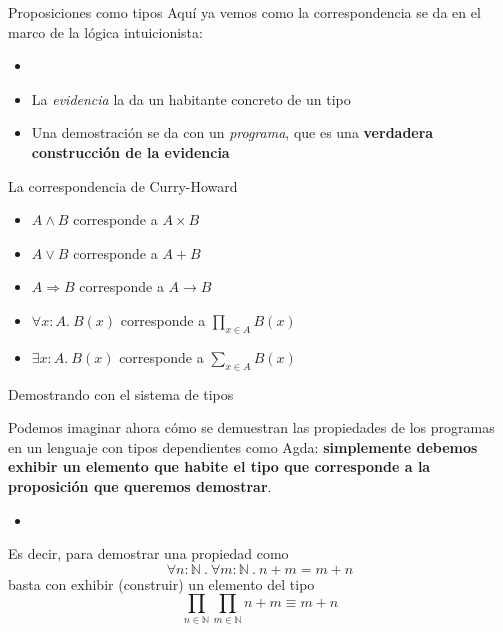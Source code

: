 \documentclass[11pt]{beamer}
\newcommand{\bit}{\begin{itemize}\setlength\itemsep{1em}}
\newcommand{\eit}{\end{itemize}}
\begin{document}
\begin{frame}{Proposiciones como tipos}
Aquí ya vemos como la correspondencia se da en el marco de la lógica intuicionista:
\bit
\item[]
\item La \textit{evidencia} la da un habitante concreto de un tipo
\item Una demostración se da con un \textit{programa}, que es una \textbf{verdadera construcción de la evidencia} 
\eit
\end{frame}

\begin{frame}{La correspondencia de Curry-Howard}
\bit
\item $A \land B$ corresponde a $A \times B$
\item $A \vee B$ corresponde a $A + B$
\item $A \Rightarrow B$ corresponde a $A \rightarrow B$
\item $\forall x:A.\ B(x)$ corresponde a $\prod_{x\in A} B(x)$
\item $\exists x:A.\ B(x)$ corresponde a $\sum_{x\in A} B(x)$
\eit

\end{frame}

\begin{frame}{Demostrando con el sistema de tipos}

Podemos imaginar ahora cómo se demuestran las propiedades de los programas en un lenguaje con tipos dependientes como Agda: \textbf{simplemente debemos exhibir un elemento que habite el tipo que corresponde a la proposición que queremos demostrar}. 

\bit
\item[]
\eit

Es decir, para demostrar una propiedad como \[ \forall n : \mathbb{N}\ .\ \forall m : \mathbb{N}\ .\ n + m = m + n  \] basta con exhibir (construir) un elemento del tipo \[ \prod_{n \in \mathbb{N}}\prod_{m \in \mathbb{N}} n + m \equiv m + n \]
\end{frame}
\end{document}
